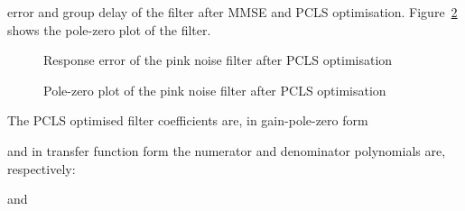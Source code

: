 \documentclass[a4paper,twoside,10pt,english]{report}
\begin{document}
error and group delay of the filter after MMSE and PCLS optimisation.
Figure~\ref{fig:iir-sqp-slb-pink-pcls-pz} shows the pole-zero plot of the filter.
\begin{figure}[!htbp]
\begin{center}
\scalebox{0.7}{}
\caption{Response error of the pink noise filter after PCLS optimisation}
\label{fig:iir-sqp-slb-pink-pcls-response}
\end{center}
\end{figure}
\begin{figure}[!htbp]
\begin{center}
\scalebox{0.7}{}
\caption{Pole-zero plot of the pink noise filter after PCLS optimisation}
\label{fig:iir-sqp-slb-pink-pcls-pz}
\end{center}
\end{figure}

The PCLS  optimised filter coefficients are, in gain-pole-zero form
\begin{small}

\end{small}
and in transfer function form the numerator and denominator polynomials are,
respectively:
\begin{small}

\end{small}
and
\begin{small}

\end{small}
\clearpage
\end{document}
